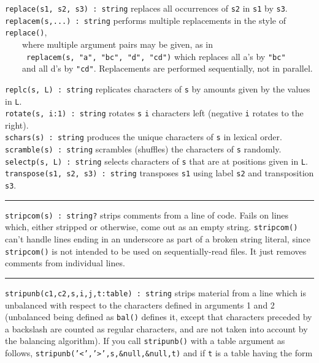 \texttt{replace(s1, s2, s3) : string} replaces all occurrences of
\texttt{s2} in \texttt{s1} by \texttt{s3}.\\
\texttt{replacem(s,...) : string} performs multiple replacements in the style of \texttt{replace()},\\
 \ \ \ \ where multiple
argument pairs may be given, as in\\
 \ \ \ \ \ \texttt{replacem(s, "a",
"bc", "d",
"cd")} which replaces all
a's by
\texttt{"bc"}\\
\ \ \ \ and all d's by
\texttt{"cd"}. Replacements are performed
sequentially, not in parallel.

\texttt{replc(s, L) : string} replicates characters of \texttt{s} by
amounts given by the values in \texttt{L}.\\
\texttt{rotate(s, i:1) : string} rotates \texttt{s} \texttt{i}
characters left (negative \texttt{i} rotates to the
right).\\
\texttt{schars(s) : string} produces the unique characters of \texttt{s}
in lexical order.\\
\texttt{scramble(s) : string} scrambles (shuffles) the characters of
\texttt{s} randomly.\\
\texttt{selectp(s, L) : string} selects characters of \texttt{s} that
are at positions given in \texttt{L}.\\
\texttt{transpose(s1, s2, s3) : string} transposes \texttt{s1} using
label \texttt{s2} and transposition \texttt{s3}.

\vspace{0.25cm}\hrule{}

\texttt{stripcom(s) : string?} strips comments from a
line of code. Fails on lines which, either stripped or otherwise,
come out as an empty string. \texttt{stripcom()} can't
handle lines ending in an underscore as part of a broken string
literal, since \texttt{stripcom()} is not intended to be used on
sequentially-read files. It just removes comments from
individual lines.

\vspace{0.25cm}\hrule{}

\texttt{stripunb(c1,c2,s,i,j,t:table) : string} strips material from a
line which is unbalanced with respect to the characters defined in
arguments 1 and 2 (unbalanced being defined as \texttt{bal()} defines
it, except that characters preceded by a backslash are counted as
regular characters, and are not taken into account by the balancing
algorithm). If you call \texttt{stripunb()} with a table argument as
follows,
\texttt{stripunb('{\textless}','{\textgreater}',s,\&null,\&null,t)}
and if \texttt{t} is a table having the form

